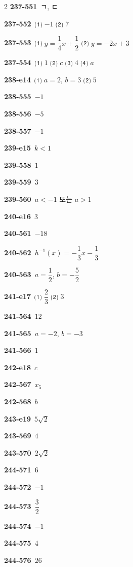 \documentclass[10pt,a4paper]{article}
\begin{document}
\begin{multicols}{2}
\noindent\textbf{237-551}\ ㄱ, ㄷ\par
\noindent\textbf{237-552}\ ⑴ $-1$ ⑵ $7$\par
\noindent\textbf{237-553}\ ⑴ $y=\dfrac{1}{4}x+\dfrac{1}{2}$ ⑵ $y=-2x+3$\par
\noindent\textbf{237-554}\ ⑴ $1$ ⑵ $c$ ⑶ $4$ ⑷ $a$\par
\noindent\textbf{238-e14}\ ⑴ $a=2$, $b=3$ ⑵ $5$\par
\noindent\textbf{238-555}\ $-1$\par
\noindent\textbf{238-556}\ $-5$\par
\noindent\textbf{238-557}\ $-1$\par
\noindent\textbf{239-e15}\ $k<1$\par
\noindent\textbf{239-558}\ $1$\par
\noindent\textbf{239-559}\ $3$\par
\noindent\textbf{239-560}\ $a<-1$ 또는 $a>1$\par
\noindent\textbf{240-e16}\ $3$\par
\noindent\textbf{240-561}\ $-18$\par
\noindent\textbf{240-562}\ $h^{-1}(x)=-\dfrac{1}{3}x-\dfrac{1}{3}$\par
\noindent\textbf{240-563}\ $a=\dfrac{1}{2}$, $b=-\dfrac{5}{2}$\par
\noindent\textbf{241-e17}\ ⑴ $\dfrac{2}{3}$ ⑵ $3$\par
\noindent\textbf{241-564}\ $12$\par
\noindent\textbf{241-565}\ $a=-2$, $b=-3$\par
\noindent\textbf{241-566}\ $1$\par
\noindent\textbf{242-e18}\ $c$\par
\noindent\textbf{242-567}\ $x_5$\par
\noindent\textbf{242-568}\ $b$\par
\noindent\textbf{243-e19}\ $5\sqrt{2}$\par
\noindent\textbf{243-569}\ $4$\par
\noindent\textbf{243-570}\ $2\sqrt{2}$\par
\noindent\textbf{244-571}\ $6$\par
\noindent\textbf{244-572}\ $-1$\par
\noindent\textbf{244-573}\ $\dfrac{3}{2}$\par
\noindent\textbf{244-574}\ $-1$\par
\noindent\textbf{244-575}\ $4$\par
\noindent\textbf{244-576}\ $26$\par

\end{multicols}
\end{document}
